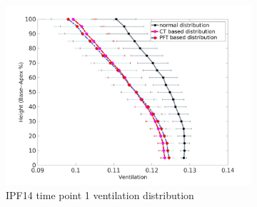 \begin{figure}[htbp]  
\centering
\begin{subfigure}{.6\linewidth}%
  \includegraphics[width=\linewidth,trim={{.0\wd0} {.0\wd0} {.0\wd0} {.0\wd0}},clip]{Appendix/Image_AppexB/IPF1401/IPF1401_VentilationAgainstLungHeight.png} %
  \caption{IPF14 time point 1 ventilation distribution}
  \label{fig:VQDistribution-a} 
\end{subfigure} 
\begin{subfigure}{.6\linewidth}%

\end{subfigure}
\end{figure}
